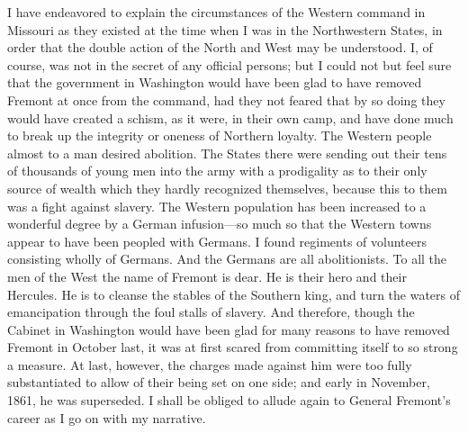 I have endeavored to explain the circumstances of the Western
command in Missouri as they existed at the time when I was in the
Northwestern States, in order that the double action of the North
and West may be understood.  I, of course, was not in the secret of
any official persons; but I could not but feel sure that the
government in Washington would have been glad to have removed
Fremont at once from the command, had they not feared that by so
doing they would have created a schism, as it were, in their own
camp, and have done much to break up the integrity or oneness of
Northern loyalty.  The Western people almost to a man desired
abolition.  The States there were sending out their tens of
thousands of young men into the army with a prodigality as to their
only source of wealth which they hardly recognized themselves,
because this to them was a fight against slavery.  The Western
population has been increased to a wonderful degree by a German
infusion---so much so that the Western towns appear to have been
peopled with Germans.  I found regiments of volunteers consisting
wholly of Germans.  And the Germans are all abolitionists.  To all
the men of the West the name of Fremont is dear.  He is their hero
and their Hercules.  He is to cleanse the stables of the Southern
king, and turn the waters of emancipation through the foul stalls
of slavery.  And therefore, though the Cabinet in Washington would
have been glad for many reasons to have removed Fremont in October
last, it was at first scared from committing itself to so strong a
measure.  At last, however, the charges made against him were too
fully substantiated to allow of their being set on one side; and
early in November, 1861, he was superseded.  I shall be obliged to
allude again to General Fremont's career as I go on with my
narrative.

